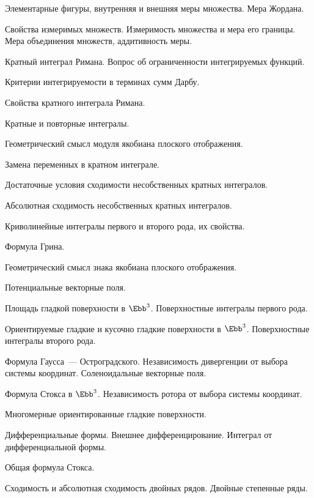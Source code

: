 \documentclass[a4paper]{article}
\begin{document}
\begin{nums}{-3}
\item Элементарные фигуры, внутренняя и внешняя меры множества. Мера Жордана.
\item Свойства измеримых множеств. Измеримость множества и мера его границы. Мера объединения множеств, аддитивность меры.
\item Кратный интеграл Римана. Вопрос об ограниченности интегрируемых функций.
\item Критерии интегрируемости в терминах сумм Дарбу.
\item Свойства кратного интеграла Римана.
\item Кратные и повторные интегралы.
\item Геометрический смысл модуля якобиана плоского отображения.
\item Замена переменных в кратном интеграле.
\item Достаточные условия сходимости несобственных кратных интегралов.
\item Абсолютная сходимость несобственных кратных интегралов.
\item Криволинейные интегралы первого и второго рода, их свойства.
\item Формула Грина.
\item Геометрический смысл знака якобиана плоского отображения.
\item Потенциальные векторные поля.
\item Площадь гладкой поверхности в $\Ebb^3$. Поверхностные интегралы первого рода.
\item Ориентируемые гладкие и кусочно гладкие поверхности в $\Ebb^3$. Поверхностные
      интегралы второго рода.
\item Формула Гаусса~--- Остроградского. Независимость дивергенции от выбора системы координат.
      Соленоидальные векторные поля.
\item Формула Стокса в $\Ebb^3$. Независимость ротора от выбора системы координат.
\item Многомерные ориентированные гладкие поверхности.
\item Дифференциальные формы. Внешнее дифференцирование. Интеграл от дифференциальной формы.
\item Общая формула Стокса.
\item Сходимость и абсолютная сходимость двойных рядов. Двойные степенные ряды.
\end{nums}

\medskip\dmvntrail
\end{document}
